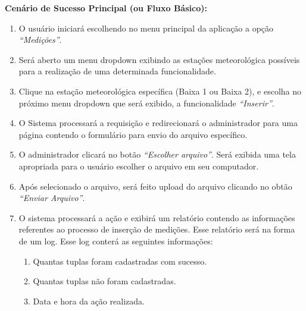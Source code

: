 \begin{quadro}[H]
\begin{framed}
\begin{flushleft}
		\textbf{Cenário de Sucesso Principal (ou Fluxo Básico):}\\
			\begin{enumerate}
				\item{O usuário iniciará escolhendo no menu principal da aplicação a opção \textit{``Medições''}.}
				\item{Será aberto um menu dropdown exibindo as estações meteorológica possíveis para a realização de uma determinada funcionalidade.}
				\item{Clique na estação meteorológica específica (Baixa 1 ou Baixa 2), e escolha no próximo menu dropdown que será exibido, a funcionalidade \textit{``Inserir''}.}
			 	\item O Sistema processará a requisição e redirecionará o administrador para uma página contendo o formulário para envio do arquivo específico.
				\item O administrador clicará no botão \textit{``Escolher arquivo''}. Será exibida uma tela apropriada para o usuário escolher o arquivo em seu computador.
				\item Após selecionado o arquivo, será feito upload do arquivo clicando no obtão \textit{``Enviar Arquivo''}.
				\item O sistema processará a ação e exibirá um relatório contendo as informações referentes ao processo de inserção de medições. Esse relatório será na forma de um log. Esse log conterá as seguintes informações:
				  \begin{enumerate}
						\item{Quantas tuplas foram cadastradas com sucesso.}
						\item{Quantas tuplas não foram cadastradas.}
						\item{Data e hora da ação realizada.}
					\end{enumerate}
			 \end{enumerate}


\end{flushleft}
\end{framed}
\end{quadro}
